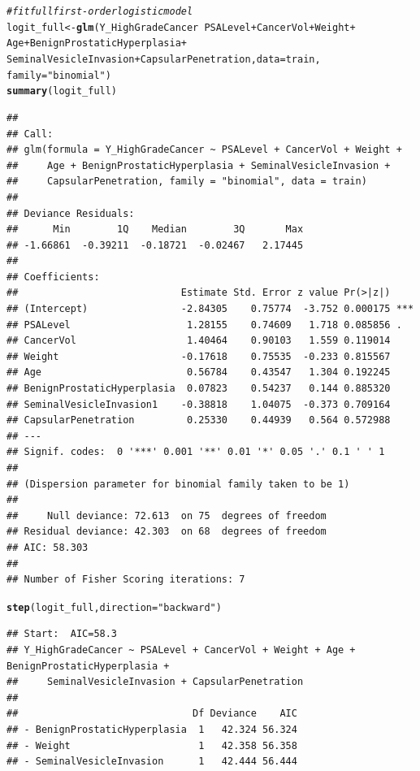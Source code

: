 \documentclass{article}\usepackage[]{graphicx}\usepackage[]{color}
\makeatletter
\newcommand{\hlstr}[1]{\textcolor[rgb]{0.192,0.494,0.8}{#1}}%
\newcommand{\hlcom}[1]{\textcolor[rgb]{0.678,0.584,0.686}{\textit{#1}}}%
\newcommand{\hlopt}[1]{\textcolor[rgb]{0,0,0}{#1}}%
\newcommand{\hlstd}[1]{\textcolor[rgb]{0.345,0.345,0.345}{#1}}%
\newcommand{\hlkwb}[1]{\textcolor[rgb]{0.69,0.353,0.396}{#1}}%
\newcommand{\hlkwc}[1]{\textcolor[rgb]{0.333,0.667,0.333}{#1}}%
\newcommand{\hlkwd}[1]{\textcolor[rgb]{0.737,0.353,0.396}{\textbf{#1}}}%
\newenvironment{kframe}{%
 \def\at@end@of@kframe{}%
 \ifinner\ifhmode%
  \def\at@end@of@kframe{\end{minipage}}%
  \begin{minipage}{\columnwidth}%
 \fi\fi%
 \def\FrameCommand##1{\hskip\@totalleftmargin \hskip-\fboxsep
 \colorbox{shadecolor}{##1}\hskip-\fboxsep
     \hskip-\linewidth \hskip-\@totalleftmargin \hskip\columnwidth}%
 \MakeFramed {\advance\hsize-\width
   \@totalleftmargin\z@ \linewidth\hsize
   \@setminipage}}%
 {\par\unskip\endMakeFramed%
 \at@end@of@kframe}
\newenvironment{knitrout}{}{} %
\makeatother
\begin{document}
\begin{knitrout}
\begin{kframe}
\begin{alltt}
\hlcom{# fit full first-order logistic model}
\hlstd{logit_full} \hlkwb{<-} \hlkwd{glm}\hlstd{(Y_HighGradeCancer} \hlopt{~} \hlstd{PSALevel} \hlopt{+} \hlstd{CancerVol} \hlopt{+} \hlstd{Weight} \hlopt{+}
                    \hlstd{Age} \hlopt{+} \hlstd{BenignProstaticHyperplasia} \hlopt{+}
                    \hlstd{SeminalVesicleInvasion} \hlopt{+} \hlstd{CapsularPenetration,} \hlkwc{data}\hlstd{=train,}
                  \hlkwc{family}\hlstd{=}\hlstr{"binomial"}\hlstd{)}
\hlkwd{summary}\hlstd{(logit_full)}
\end{alltt}
\begin{verbatim}
## 
## Call:
## glm(formula = Y_HighGradeCancer ~ PSALevel + CancerVol + Weight + 
##     Age + BenignProstaticHyperplasia + SeminalVesicleInvasion + 
##     CapsularPenetration, family = "binomial", data = train)
## 
## Deviance Residuals: 
##      Min        1Q    Median        3Q       Max  
## -1.66861  -0.39211  -0.18721  -0.02467   2.17445  
## 
## Coefficients:
##                            Estimate Std. Error z value Pr(>|z|)    
## (Intercept)                -2.84305    0.75774  -3.752 0.000175 ***
## PSALevel                    1.28155    0.74609   1.718 0.085856 .  
## CancerVol                   1.40464    0.90103   1.559 0.119014    
## Weight                     -0.17618    0.75535  -0.233 0.815567    
## Age                         0.56784    0.43547   1.304 0.192245    
## BenignProstaticHyperplasia  0.07823    0.54237   0.144 0.885320    
## SeminalVesicleInvasion1    -0.38818    1.04075  -0.373 0.709164    
## CapsularPenetration         0.25330    0.44939   0.564 0.572988    
## ---
## Signif. codes:  0 '***' 0.001 '**' 0.01 '*' 0.05 '.' 0.1 ' ' 1
## 
## (Dispersion parameter for binomial family taken to be 1)
## 
##     Null deviance: 72.613  on 75  degrees of freedom
## Residual deviance: 42.303  on 68  degrees of freedom
## AIC: 58.303
## 
## Number of Fisher Scoring iterations: 7
\end{verbatim}
\begin{alltt}
\hlkwd{step}\hlstd{(logit_full,} \hlkwc{direction}\hlstd{=}\hlstr{"backward"}\hlstd{)}
\end{alltt}
\begin{verbatim}
## Start:  AIC=58.3
## Y_HighGradeCancer ~ PSALevel + CancerVol + Weight + Age + BenignProstaticHyperplasia + 
##     SeminalVesicleInvasion + CapsularPenetration
## 
##                              Df Deviance    AIC
## - BenignProstaticHyperplasia  1   42.324 56.324
## - Weight                      1   42.358 56.358
## - SeminalVesicleInvasion      1   42.444 56.444

\end{verbatim}
\end{kframe}
\end{knitrout}
\end{document}
